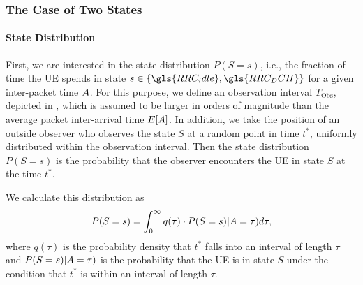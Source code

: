 \subsubsection*{The Case of Two  States}\label{sec:network:performance_model:analytical_model:two_states}

\newcommand{\RRCState}{S}
\newcommand{\PacketIATDensity}{a}
\newcommand{\RRCStateRealization}{s}
\newcommand{\ObservationInterval}{T_{\text{Obs}}}
\newcommand{\ObservationPoint}{t^*}
\newcommand{\ObservationIntervalDensity}{q}
\newcommand{\ObservationIntervalLength}{\tau}
\newcommand{\NormalisationConstant}{c_0}
\newcommand{\NObservedPackets}{n_{\text{P}}}

\paragraph*{State Distribution}
First, we are interested in the state distribution \(P(\RRCState=\RRCStateRealization)\), i.e., the fraction of time the \gls{UE} spends in state \(\RRCStateRealization\in\{\gls{RRC_idle},\gls{RRC_DCH}\}\) for a given inter-packet time \(A\).
For this purpose, we define an observation interval \(\ObservationInterval\), depicted in , which is assumed to be larger in orders of magnitude than the average packet inter-arrival time \(E[A]\).
In addition, we take the position of an outside observer who observes the state \(\RRCState\) at a random point in time \(\ObservationPoint\), uniformly distributed within the observation interval. 
Then the state distribution \(P(\RRCState=\RRCStateRealization)\) is the probability that the observer encounters the \gls{UE} in state \(\RRCState\) at the time \(\ObservationPoint\). 

We calculate this distribution as 
\begin{equation}
P(\RRCState=\RRCStateRealization)= 
  \int_{0}^\infty \ObservationIntervalDensity(\tau) \cdot 
  P(\RRCState=\RRCStateRealization) \vert \PacketIAT = \ObservationIntervalLength) d\ObservationIntervalLength,
  \label{eq:network:performance_model:system_description:state_distribution} 
\end{equation} 
where \(\ObservationIntervalDensity(\ObservationIntervalLength)\) is the probability density that \(\ObservationPoint\) falls into an interval of length \(\ObservationIntervalLength\) and 
\(P(\RRCState=\RRCStateRealization) \vert \PacketIAT = \ObservationIntervalLength)\)
is the probability that the \gls{UE} is in state \(\RRCState\) under the condition that \(\ObservationPoint\) is within an interval of length \(\ObservationIntervalLength\).

